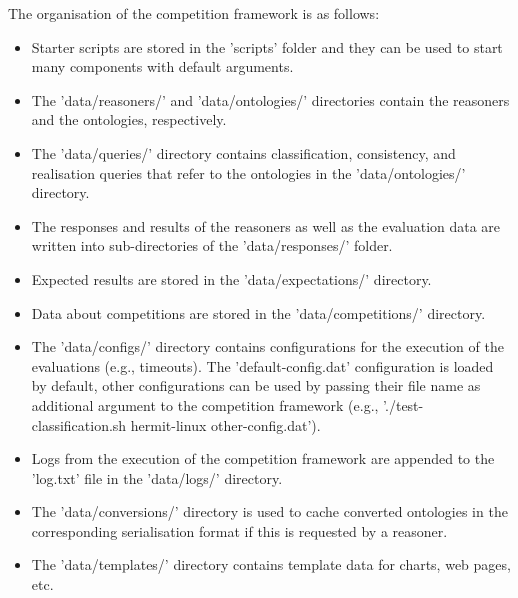 \documentclass{article}
\begin{document}
The organisation of the competition framework is as follows:
\begin{itemize}
\item Starter scripts are stored in the 'scripts' folder and they can be used to start many components with default arguments.
\item The 'data/reasoners/' and 'data/ontologies/' directories contain the reasoners and the ontologies, respectively.
\item The 'data/queries/' directory contains classification, consistency, and realisation queries that refer to the ontologies in the 'data/ontologies/' directory.
\item The responses and results of the reasoners as well as the evaluation data are written into sub-directories of the 'data/responses/' folder.
\item Expected results are stored in the 'data/expectations/' directory.
\item Data about competitions are stored in the 'data/competitions/' directory.
\item The 'data/configs/' directory contains configurations for the execution of the evaluations (e.g., timeouts). The 'default-config.dat' configuration is loaded by default, other configurations can be used by passing their file name as additional argument to the competition framework (e.g., './test-classification.sh hermit-linux other-config.dat').
\item Logs from the execution of the competition framework are appended to the 'log.txt' file in the 'data/logs/' directory.
\item The 'data/conversions/' directory is used to cache converted ontologies in the corresponding serialisation format if this is requested by a reasoner.
\item The 'data/templates/' directory contains template data for charts, web pages, etc.
\end{itemize}
\end{document}
